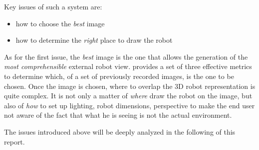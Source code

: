 %
Key issues of such a system are:
\begin{itemize}
\item how to choose the \textit{best} image
\item how to determine the \textit{right} place to draw the robot
\end{itemize}
%
As for the first issue, the \textit{best} image is the one that allows 
the generation of the \textit{most comprehensible} external robot view.
\cite{sugimoto} provides a set of three effective metrics to 
determine which, of a set of previously recorded images, is the 
one to be chosen.
%
Once the image is chosen, where to overlap the 3D robot representation 
is quite complex. It is not only a matter of \textit{where} draw the robot
on the image, but also of \textit{how} to set up lighting, robot dimensions,
perspective to make the end user not aware of the fact that what he is
seeing is not the actual environment.
%

%
The issues introduced above will be deeply analyzed in the following 
of this report.
%
